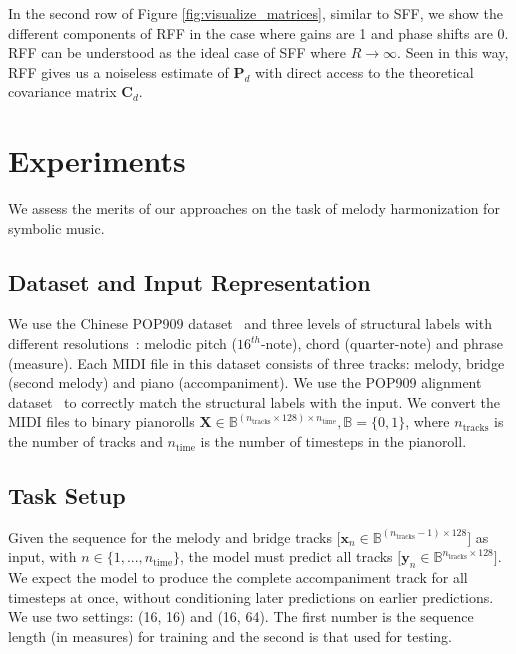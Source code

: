 In the second row of Figure \ref{fig:visualize_matrices}, similar to SFF, we show the different components of RFF in the case where gains are 1 and phase shifts are 0. RFF can be understood as the ideal case of SFF where $R \to \infty$. Seen in this way, RFF gives us a noiseless estimate of $\mathbf{P}_d$ with direct access to the theoretical covariance matrix $\mathbf{C}_d$.


\section{Experiments}
We assess the merits of our approaches on the task of melody harmonization for symbolic music.

\subsection{Dataset and Input Representation} \label{sssection:data_input}
We use the Chinese POP909 dataset~\cite{wang_pop909_2020} and three levels of structural labels with different resolutions~\cite{dai_automatic_2020}: melodic pitch ($16^{th}$-note), chord (quarter-note) and phrase (measure). Each MIDI file in this dataset consists of three tracks: melody, bridge (second melody) and piano (accompaniment). 
We use the POP909 alignment dataset~\cite{agarwal_structure_2024} to correctly match the structural labels with the input. We convert the MIDI files to binary pianorolls $\mathbf{X} \in \mathbb{B}^{(n_\text{tracks} \times 128) \times n_\text{time}}, \mathbb{B} = \{0, 1\}$, where $n_\text{tracks}$ is the number of tracks and $n_\text{time}$ is the number of timesteps in the pianoroll.

\subsection{Task Setup}
Given the sequence for the melody and bridge tracks $\big[ \mathbf{x}_n \in \mathbb{B}^{(n_\text{tracks} - 1) \times 128} \big]$ as input, with $n \in \{ 1, ..., n_\text{time}\}$, the model must predict all tracks $\big[ \mathbf{y}_n \in \mathbb{B}^{n_\text{tracks} \times 128} \big]$. We expect the model to produce the complete accompaniment track for all timesteps at once, without conditioning later predictions on earlier predictions. 
We use two settings: (16, 16) and (16, 64). The first number is the sequence length (in measures) for training and the second is that used for testing.

